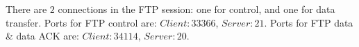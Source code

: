 There are $2$ connections in the FTP session: one for control, and one for data transfer.
Ports for FTP control are: $Client: 33366$, $Server: 21$.
Ports for FTP data \& data ACK are: $Client: 34114$, $Server: 20$.
